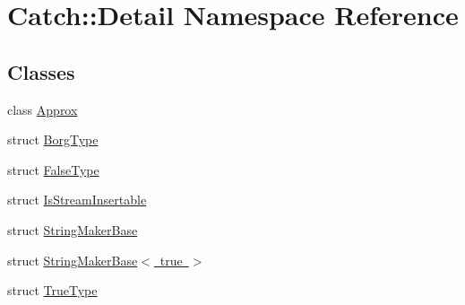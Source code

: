\hypertarget{namespace_catch_1_1_detail}{}\section{Catch\+:\+:Detail Namespace Reference}
\label{namespace_catch_1_1_detail}
\subsection*{Classes}
\begin{DoxyCompactItemize}
\item 
class \mbox{\hyperlink{class_catch_1_1_detail_1_1_approx}{Approx}}
\item 
struct \mbox{\hyperlink{struct_catch_1_1_detail_1_1_borg_type}{Borg\+Type}}
\item 
struct \mbox{\hyperlink{struct_catch_1_1_detail_1_1_false_type}{False\+Type}}
\item 
struct \mbox{\hyperlink{struct_catch_1_1_detail_1_1_is_stream_insertable}{Is\+Stream\+Insertable}}
\item 
struct \mbox{\hyperlink{struct_catch_1_1_detail_1_1_string_maker_base}{String\+Maker\+Base}}
\item 
struct \mbox{\hyperlink{struct_catch_1_1_detail_1_1_string_maker_base_3_01true_01_4}{String\+Maker\+Base$<$ true $>$}}
\item 
struct \mbox{\hyperlink{struct_catch_1_1_detail_1_1_true_type}{True\+Type}}
\end{DoxyCompactItemize}

